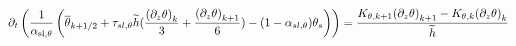 \begin{equation}
	\label{eq:ND_StratifiedCase_semiDiscreteEkmanEqPTFVfree}
	\partial_t \left(\frac{1}{\alpha_{\rm sl, \theta}}
	\left(
	\overline{\theta}_{k+1/2} + \tau_{sl, \theta}
	\widetilde{h}(\frac{{(\partial_z \theta)}_k}{3} +
	\frac{{(\partial_z \theta)}_{k+1}}{6})
	 - (1 - \alpha_{sl, \theta})\theta_s
	\right) \right)
	= \frac{K_{\theta, k+1}{(\partial_z \theta)}_{k+1} -
	K_{\theta,k} {(\partial_z \theta)}_k}{\widetilde{h}}
\end{equation}

